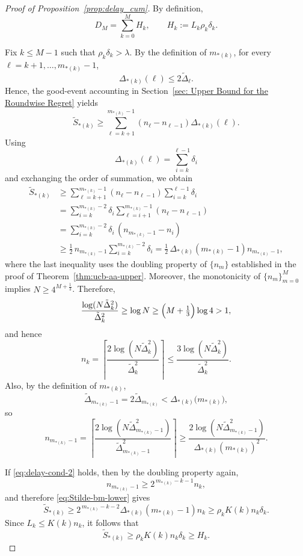 \documentclass[11pt]{article}
\begin{document}
\begin{proof}[Proof of Proposition~\ref{prop:delay_cum}]
By definition,
\begin{equation}\label{eq:delayDm-upper}
D_M
=
\sum_{k=0}^{M}H_k,
\qquad
H_k:=L_k\rho_k\delta_k .
\end{equation}

Fix $k\le M-1$ such that $\rho_k\delta_k>\lambda$. By the definition of $m_{*(k)}$, for every
$\ell=k+1,\dots,m_{*(k)}-1$,
\[
\Delta_{*(k)}(\ell)\le 2\tilde{\Delta}_\ell.
\]
Hence, the good-event accounting in Section~\ref{sec: Upper Bound for the Roundwise Regret} yields
\[
\tilde S_{*(k)}
\ge
\sum_{\ell=k+1}^{m_{*(k)}-1}(n_\ell-n_{\ell-1})\Delta_{*(k)}(\ell).
\]
Using
\[
\Delta_{*(k)}(\ell)=\sum_{i=k}^{\ell-1}\delta_i
\]
and exchanging the order of summation, we obtain
\begin{align}
\tilde S_{*(k)}
&\ge
\sum_{\ell=k+1}^{m_{*(k)}-1}(n_\ell-n_{\ell-1})
\sum_{i=k}^{\ell-1}\delta_i \nonumber\\
&=
\sum_{i=k}^{m_{*(k)}-2}\delta_i
\sum_{\ell=i+1}^{m_{*(k)}-1}(n_\ell-n_{\ell-1}) \nonumber\\
&=
\sum_{i=k}^{m_{*(k)}-2}\delta_i\,(n_{m_{*(k)}-1}-n_i) \nonumber\\
&\ge
\frac12\,n_{m_{*(k)}-1}\sum_{i=k}^{m_{*(k)}-2}\delta_i
=
\frac12\,\Delta_{*(k)}(m_{*(k)}-1)n_{m_{*(k)}-1},
\label{eq:Stilde-bm-lower}
\end{align}
where the last inequality uses the doubling property of $\{n_m\}$ established in the proof of
Theorem~\ref{thm:ucb-aa-upper}. Moreover, the monotonicity of $\{n_m\}_{m=0}^M$ implies $N\ge 4^{M+\frac13}$. Therefore,
\[
\frac{\log(N\tilde{\Delta}_k^2)}{\tilde{\Delta}_k^2}
\ge
\log N
\ge
\Bigl(M+\tfrac13\Bigr)\log 4
>1,
\]
and hence
\[
n_k
=
\left\lceil
\frac{2\log(N\tilde{\Delta}_k^2)}{\tilde{\Delta}_k^2}
\right\rceil
\le
\frac{3\log(N\tilde{\Delta}_k^2)}{\tilde{\Delta}_k^2}.
\]
Also, by the definition of $m_{*(k)}$,
\[
\tilde{\Delta}_{m_{*(k)}-1}
=
2\tilde{\Delta}_{m_{*(k)}}
<
\Delta_{*(k)}\bigl(m_{*(k)}\bigr),
\]
so
\[
n_{m_{*(k)}-1}
=
\left\lceil
\frac{2\log(N\tilde{\Delta}_{m_{*(k)}-1}^2)}
{\tilde{\Delta}_{m_{*(k)}-1}^2}
\right\rceil
\ge
\frac{2\log(N\tilde{\Delta}_{m_{*(k)}-1}^2)}
{\Delta_{*(k)}(m_{*(k)})^2}.
\]

If \eqref{eq:delay-cond-2} holds, then by the doubling property again,
\[
n_{m_{*(k)}-1}\ge 2^{\,m_{*(k)}-k-1}n_k,
\]
and therefore \eqref{eq:Stilde-bm-lower} gives
\[
\tilde S_{*(k)}
\ge
2^{\,m_{*(k)}-k-2}\Delta_{*(k)}(m_{*(k)}-1)n_k
\ge
\rho_k K(k)n_k\delta_k.
\]
Since $L_k\le K(k)n_k$, it follows that
\[
\tilde S_{*(k)}\ge \rho_k K(k)n_k\delta_k\ge H_k.
\]


\end{proof}
\end{document}
